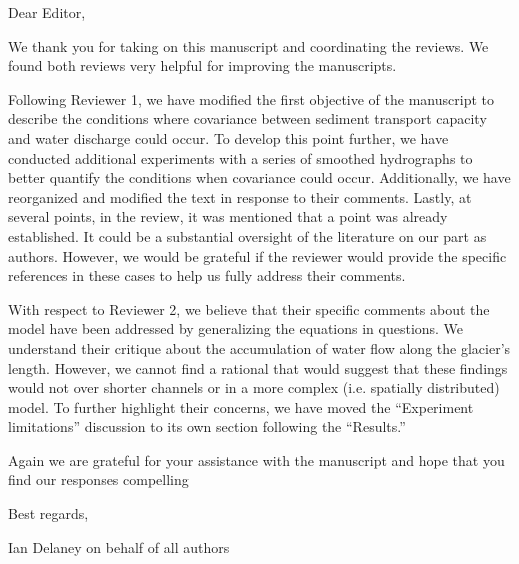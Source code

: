 \documentclass[11pt]{article}
\title{}
\author{}
\begin{document}
Dear Editor,

\vspace{.3cm}

We thank you for taking on this manuscript and coordinating the reviews. We found both reviews very helpful for improving the manuscripts.

\vspace{.2cm}

Following Reviewer 1, we have modified the first objective of the manuscript to describe the conditions where covariance between sediment transport capacity and water discharge could occur.
To develop this point further, we have conducted additional experiments with a series of smoothed hydrographs to better quantify the conditions when covariance could occur.
Additionally, we have reorganized and modified the text in response to their comments.
Lastly, at several points, in the review, it was mentioned that a point was already established.
It could be a substantial oversight of the literature on our part as authors.
However, we would be grateful if the reviewer would provide the specific references in these cases to help us fully address their comments.

\vspace{.2cm}

With respect to Reviewer 2, we believe that their specific comments about the model have been addressed by generalizing the equations in questions.
We understand their critique about the accumulation of water flow along the glacier's length.
However, we cannot find a rational that would suggest that these findings would not over shorter channels or in a more complex (i.e. spatially distributed) model.
To further highlight their concerns, we have moved the ``Experiment limitations'' discussion to its own section following the ``Results.''

\vspace{.2cm}
Again we are grateful for your assistance with the manuscript and hope that you find our responses compelling


\vspace{.5cm}

Best regards,

\vspace{.75cm}

Ian Delaney on behalf of all authors


 

\end{document}

